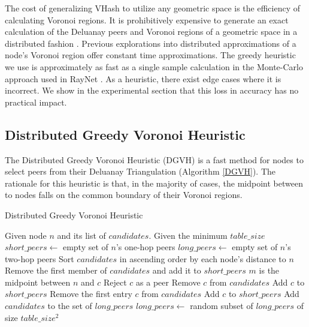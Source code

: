 \documentclass[10pt, conference, letterpaper]{IEEEtran}
\begin{document}
The cost of generalizing VHash to utilize any geometric space is the efficiency of calculating Voronoi regions. 
It is prohibitively expensive to generate an exact calculation of the Deluanay peers and Voronoi regions of a geometric space in a distributed fashion \cite{raynet}.  %
Previous explorations into distributed approximations of a node's Voronoi region offer constant time approximations.
The greedy heuristic we use is approximately as fast as a single sample calculation in the Monte-Carlo approach used in RayNet \cite{raynet}.
As a heuristic, there exist edge cases where it is incorrect.
We show in the experimental section that this loss in accuracy has no practical impact.

\subsection{Distributed Greedy Voronoi Heuristic}
The Distributed Greedy Voronoi Heuristic (DGVH) is a fast method for nodes to select peers from their Deluanay Triangulation (Algorithm \ref{DGVH}).
The rationale for this heuristic is that, in the majority of cases, the midpoint between to nodes falls on the common boundary of their Voronoi regions.

\begin{algorithm} %
\caption{Distributed Greedy Voronoi Heuristic}
\label{DGVH}
\begin{algorithmic}[1]  %
	 \STATE Given node $n$ and its list of $candidates$.
   	 \STATE Given the minimum $table\_size$
    \STATE $short\_peers \leftarrow$ empty set of $n$'s one-hop peers
	 \STATE $long\_peers \leftarrow$ empty set of $n$'s two-hop peers    
    \STATE Sort $candidates$ in ascending order by each node's distance to $n$
    \STATE Remove the first member of $candidates$ and add it to $short\_peers$
    	\STATE $m$ is the midpoint between $n$ and $c$
        	\STATE Reject $c$ as a peer
        \ELSE
        	\STATE Remove $c$ from $candidates$
        	\STATE Add $c$ to $short\_peers$
        \ENDIF
    \ENDFOR
    	\STATE Remove the first entry $c$ from $candidates$
    	\STATE Add $c$ to $short\_peers$
    \ENDWHILE
    	\STATE Add $candidates$ to the set of $long\_peers$	
        		\STATE $long\_peers \leftarrow$ random subset of $long\_peers$ of size $table\_size^2$
      \ENDIF
\end{algorithmic}
\end{algorithm}
\end{document}
